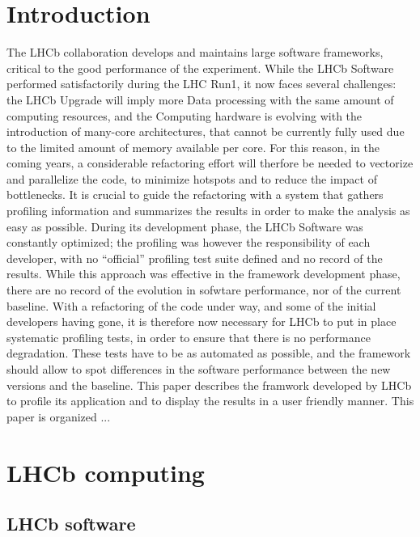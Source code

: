 \documentclass[a4paper]{jpconf}
\begin{document}
\newpage

\section{Introduction}
\label{sec:introduction}

The LHCb collaboration develops and maintains large software frameworks, critical to the good performance of the experiment. While the LHCb Software performed satisfactorily during the LHC Run1, it now faces several challenges: the LHCb Upgrade will imply more Data processing with the same amount of computing resources, and the Computing hardware is evolving with the introduction of many-core architectures, that cannot be currently fully used due to the limited amount of memory available per core. For this reason, in the coming years, a considerable refactoring effort will therfore be needed to vectorize and parallelize the code, to minimize hotspots and to reduce the impact of bottlenecks. It is crucial to guide the refactoring with a system that gathers profiling information and summarizes the results in order to make the analysis as easy as possible.
\newline
During its development phase, the LHCb Software was constantly optimized; the profiling was however the responsibility of each developer, with no ``official'' profiling test suite defined and no record of the results. While this approach was effective in the framework development phase, there are no record of the evolution in sofwtare performance, nor of the current baseline. With a refactoring of the code under way, and some of the initial developers having gone, it is therefore now necessary for LHCb to put in place systematic profiling tests, in order to ensure that there is no performance degradation. These tests have to be as automated as possible, and the framework should allow to spot differences in the software performance between the new versions and the baseline.
\newline
This paper describes the framwork developed by LHCb to profile its application and to display the results in a user friendly manner. This paper is organized ...

\section{LHCb computing}
\label{sec:lhcb_computing}

\subsection{LHCb software}
\label{sec:lhcb_software}
\end{document}
